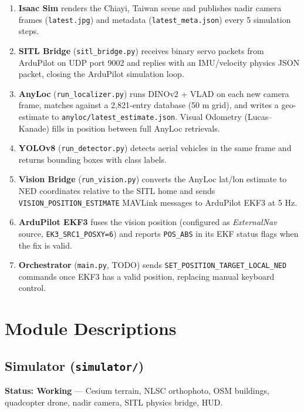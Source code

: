 \documentclass[11pt,a4paper]{article}
\begin{document}
\begin{enumerate}
  \item \textbf{Isaac Sim} renders the Chiayi, Taiwan scene and publishes nadir camera frames (\texttt{latest.jpg}) and metadata (\texttt{latest\_meta.json}) every 5 simulation steps.
  \item \textbf{SITL Bridge} (\texttt{sitl\_bridge.py}) receives binary servo packets from ArduPilot on UDP port 9002 and replies with an IMU/velocity physics JSON packet, closing the ArduPilot simulation loop.
  \item \textbf{AnyLoc} (\texttt{run\_localizer.py}) runs DINOv2 + VLAD on each new camera frame, matches against a 2,821-entry database (50 m grid), and writes a geo-estimate to \texttt{anyloc/latest\_estimate.json}.  Visual Odometry (Lucas--Kanade) fills in position between full AnyLoc retrievals.
  \item \textbf{YOLOv8} (\texttt{run\_detector.py}) detects aerial vehicles in the same frame and returns bounding boxes with class labels.
  \item \textbf{Vision Bridge} (\texttt{run\_vision.py}) converts the AnyLoc lat/lon estimate to NED coordinates relative to the SITL home and sends \texttt{VISION\_POSITION\_ESTIMATE} MAVLink messages to ArduPilot EKF3 at 5 Hz.
  \item \textbf{ArduPilot EKF3} fuses the vision position (configured as \textit{ExternalNav} source, \texttt{EK3\_SRC1\_POSXY=6}) and reports \texttt{POS\_ABS} in its EKF status flags when the fix is valid.
  \item \textbf{Orchestrator} (\texttt{main.py}, TODO) sends \texttt{SET\_POSITION\_TARGET\_LOCAL\_NED} commands once EKF3 has a valid position, replacing manual keyboard control.
\end{enumerate}

\section{Module Descriptions}
\label{sec:modules}

\subsection{Simulator (\texttt{simulator/})}
\label{sec:sim}

\begin{donebox}
\textbf{Status: Working} --- Cesium terrain, NLSC orthophoto, OSM buildings, quadcopter drone, nadir camera, SITL physics bridge, HUD.
\end{donebox}
\end{document}
